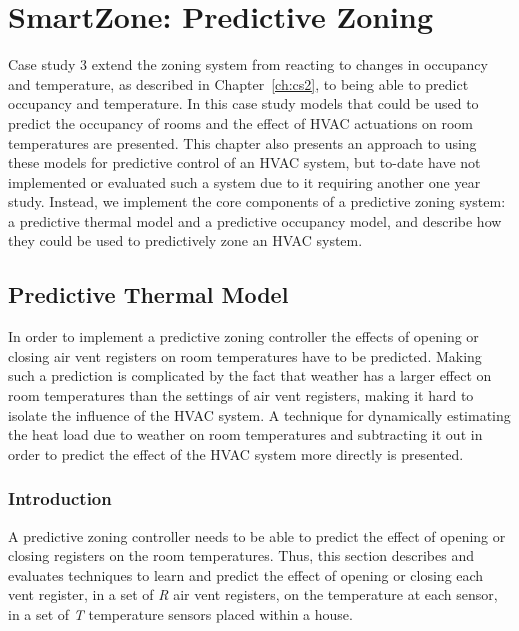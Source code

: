 \chapter{SmartZone: Predictive Zoning}
\label{sec:cs3}

Case study 3 extend the zoning system from reacting to changes in occupancy and
temperature, as described in Chapter~\ref{ch:cs2}, to being able to predict
occupancy and temperature. In this case study models that could be used to
predict the occupancy of rooms and the effect of HVAC actuations on room
temperatures are presented. This chapter also presents an approach to using
these models for predictive control of an HVAC system, but to-date have not
implemented or evaluated such a system due to it requiring another one year
study. Instead, we implement the core components of a predictive zoning system:
a predictive thermal model and a predictive occupancy model, and describe how
they could be used to predictively zone an HVAC system.

\section{Predictive Thermal Model}
\label{sec:cs3thermalModel}

In order to implement a predictive zoning controller the effects of opening or
closing air vent registers on room temperatures have to be predicted. Making such
a prediction is complicated by the fact that weather has a larger effect on room
temperatures than the settings of air vent registers, making it hard to isolate
the influence of the HVAC system. A technique for dynamically estimating the
heat load due to weather on room temperatures and subtracting it out in order to
predict the effect of the HVAC system more directly is presented.

\subsection{Introduction}
\label{sec:introduction}

\newcommand{\tab}{\hspace*{2em}}

A predictive zoning controller needs to be able to predict the effect of opening
or closing registers on the room temperatures. Thus, this section describes and
evaluates techniques to learn and predict the effect of opening or closing each
vent register, in a set of {\em R} air vent registers, on the temperature at
each sensor, in a set of {\em T} temperature sensors placed within a house.

